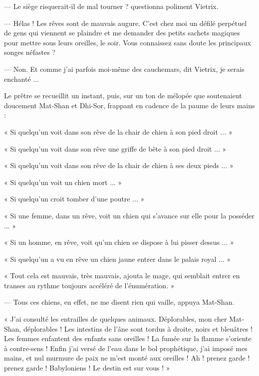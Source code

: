 \documentclass[a4paper, 11pt, oneside, polutonikogreek, french]{article}
\begin{document}
--- Le siège risquerait-il de mal tourner ? questionna poliment Vietrix.

--- Hélas ! Les rêves sont de mauvais augure. C'est chez moi un défilé perpétuel de gens qui viennent se plaindre et me demander des petits sachets magiques pour mettre sous leurs oreilles, le soir. Vous connaissez sans doute les principaux songes néfastes ?

--- Non. Et comme j'ai parfois moi-même des cauchemars, dit Vietrix, je serais enchanté ...

\bigskip
\centerline{\EightStarTaper}
\centerline{\EightStarTaper\EightStarTaper}
\bigskip

Le prêtre se recueillit un instant, puis, sur un ton de mélopée que soutenaient doucement Mat-Shan et Dhi-Sor, frappant en cadence de la paume de leurs mains :

« Si quelqu'un voit dans son rêve de la chair de chien à son pied droit ... »

« Si quelqu'un voit dans son rêve une griffe de bête à son pied droit ... »

« Si quelqu'un voit dans son rêve de la chair de chien à ses deux pieds ... »

« Si quelqu'un voit un chien mort ... »

« Si quelqu'un croit tomber d'une poutre ... »

« Si une femme, dans un rêve, voit un chien qui s'avance sur elle pour la posséder ... »

« Si un homme, en rêve, voit qu'un chien se dispose à lui pisser dessus ... »

« Si quelqu'un a vu en rêve un chien jaune entrer dans le palais royal ... »

\bigskip
\centerline{\EightStarTaper}
\centerline{\EightStarTaper\EightStarTaper}
\bigskip

« Tout cela est mauvais, très mauvais, ajouta le mage, qui semblait entrer en transes au rythme toujours accéléré de l'énumération. »

--- Tous ces chiens, en effet, ne me disent rien qui vaille, appuya Mat-Shan.

« J'ai consulté les entrailles de quelques animaux. Déplorables, mon cher Mat-Shan, déplorables ! Les intestins de l'âne sont tordus à droite, noirs et bleuâtres ! Les femmes enfantent des enfants sans oreilles ! La fumée sur la flamme s'oriente à contre-sens ! Enfin j'ai versé de l'eau dans le bol prophétique, j'ai imposé mes mains, et nul murmure de paix ne m'est monté aux oreilles ! Ah ! prenez garde ! prenez garde ! Babyloniens ! Le destin est sur vous ! »
\end{document}
